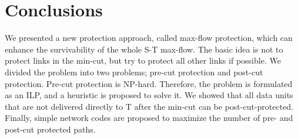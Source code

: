 \documentclass[conference]{IEEEtran}
\begin{document}
\section{Conclusions}
\label{Sec:conc}
We presented a new protection approach, called max-flow protection, which can enhance the survivability of the whole S-T max-flow. The basic idea is not to protect links in the min-cut, but try to protect all other links if possible. We divided the problem into two problems; pre-cut protection and post-cut protection. Pre-cut protection is NP-hard. Therefore, the problem is formulated as an ILP, and a heuristic is proposed to solve it. We showed that all data units that are not delivered directly to T after the min-cut can be post-cut-protected. Finally, simple network codes are proposed to maximize the number of pre- and post-cut protected paths.
  






































 


\end{document}
